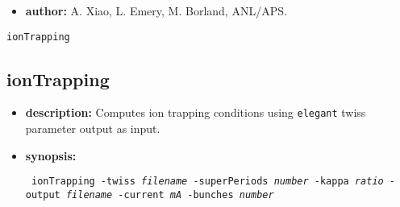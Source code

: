 \documentclass[11pt]{article}
\begin{document}
\begin{itemize}
\item {\bf author:} A. Xiao, L. Emery, M. Borland, ANL/APS.
\end{itemize}

\newpage
\begin{center}{\Large\verb|ionTrapping|}\end{center}
\subsection{ionTrapping}

\begin{itemize}
\item {\bf description:}   Computes ion trapping conditions using {\tt elegant} twiss parameter
output as input.

\item {\bf synopsis:}
\begin{flushleft}{\tt
ionTrapping -twiss {\em filename} -superPeriods {\em number} -kappa {\em ratio} 
-output {\em filename} -current {\em mA} -bunches {\em number}
}\end{flushleft}


\end{itemize}
\end{document}
